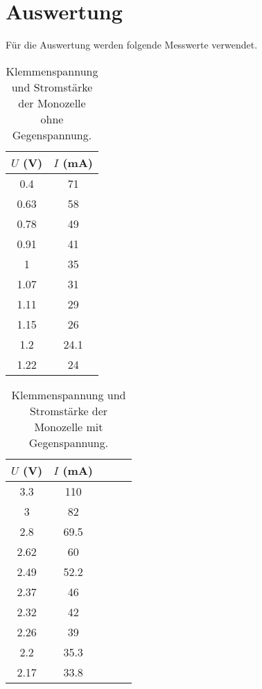 \section{Auswertung}
\label{sec:Auswertung}

Für die Auswertung werden folgende Messwerte verwendet.

\begin{table}
  \centering
  \caption{Klemmenspannung und Stromstärke der Monozelle ohne Gegenspannung.}
  \label{tab:daten_plot1}
  \begin{tabular}{c c}
    \toprule
    $U$ (V) & $I$ (mA) \\
    \midrule
     0.4  &   71 \\
    0.63  &   58 \\
    0.78  &   49 \\
    0.91  &   41 \\
       1  &   35 \\
    1.07  &   31 \\
    1.11  &   29 \\
    1.15  &   26 \\
     1.2  & 24.1 \\
    1.22  &   24 \\
    \bottomrule
  \end{tabular}
\end{table}

\begin{table}
  \centering
  \caption{Klemmenspannung und Stromstärke der Monozelle mit Gegenspannung.}
  \label{tab:daten_plot2}
  \begin{tabular}{c c c c c}
    \toprule
    $U$ (V) & $I$ (mA) \\
    \midrule
     3.3 &  110 \\
       3 &   82 \\
     2.8 & 69.5 \\
    2.62 &   60 \\
    2.49 & 52.2 \\
    2.37 &   46 \\
    2.32 &   42 \\
    2.26 &   39 \\
     2.2 & 35.3 \\
    2.17 & 33.8 \\
    \bottomrule
  \end{tabular}
\end{table}

